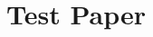 \documentclass[10pt, sigconf, natbib, sort&compress, screen, letterpage]{acmart}
\begin{document}
\title{Test Paper}
\author{}



\maketitle



\end{document}
